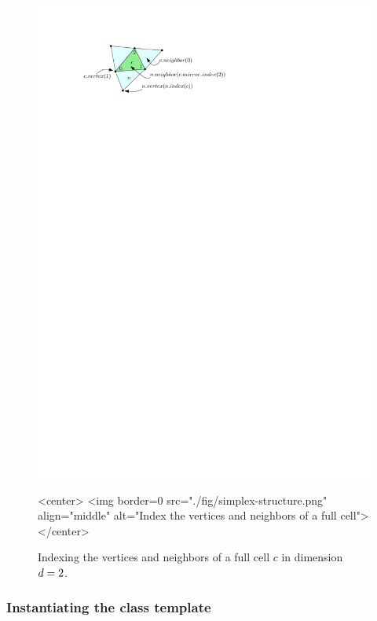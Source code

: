 \begin{figure}[htbp]
\begin{ccTexOnly}
\begin{center}
\includegraphics{Triangulation/fig/simplex-structure.pdf}
\end{center}
\end{ccTexOnly}
\begin{ccHtmlOnly}
<center>
<img border=0 src="./fig/simplex-structure.png" align="middle"
alt="Index the vertices and neighbors of a full cell">
</center>
\end{ccHtmlOnly}
\caption{Indexing the vertices and neighbors of a full cell $c$ in
  dimension $d=2$.}
\label{triangulation:fig:full-cell}
\end{figure} 

\subsubsection{Instantiating the class template}


